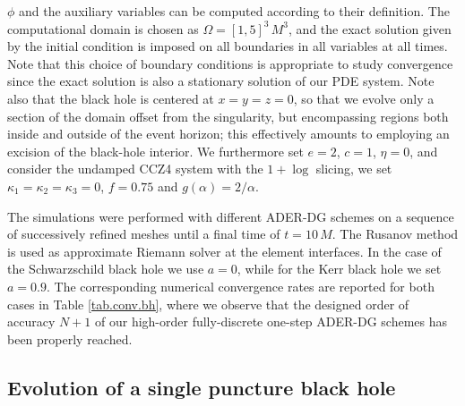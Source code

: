 $\phi$ and the auxiliary variables can be computed according to their
definition. The computational domain is chosen as $\Omega = [1,5]^3 \,
M^3$, and the exact solution given by the initial condition is imposed on
all boundaries in all variables at all times. Note that this choice of
boundary conditions is appropriate to study convergence since the exact
solution is also a stationary solution of our PDE system. Note also that
the black hole is centered at $x=y=z=0$, so that we evolve only a section
of the domain offset from the singularity, but encompassing regions both
inside and outside of the event horizon; this effectively amounts to
employing an excision of the black-hole interior.  We furthermore set
$e=2$, $c=1$, $\eta=0$, and consider the undamped CCZ4 system with the
$1+\log$ slicing, \ie we set $\kappa_1 = \kappa_2 = \kappa_3 = 0$,
$f=0.75$ and $g(\alpha)=2 / \alpha$.

The simulations were performed with different ADER-DG schemes on a
sequence of successively refined meshes until a final time of
$t=10\,M$. The Rusanov method is used as approximate Riemann solver at
the element interfaces. In the case of the Schwarzschild black hole we
use $a=0$, while for the Kerr black hole we set $a=0.9$. The
corresponding numerical convergence rates are reported for both cases in
Table \ref{tab.conv.bh}, where we observe that the designed order of
accuracy $N+1$ of our high-order fully-discrete one-step ADER-DG schemes
has been properly reached.


\subsection{Evolution of a single puncture black hole}
\label{sec.single.punctures}

